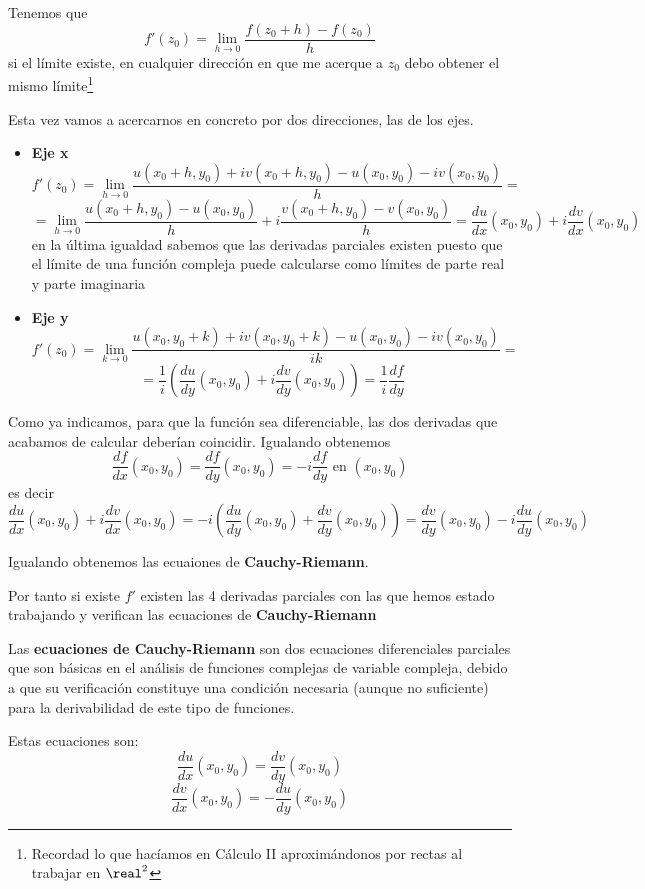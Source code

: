 \documentclass{apuntes}
\begin{document}
Tenemos que
\[f'(z_0)=\lim_{h \to 0} \frac{f(z_0+h)-f(z_0)}{h}\]
si el límite existe, en cualquier dirección en que me acerque a $z_0$ debo obtener el mismo límite\footnote{Recordad lo que hacíamos en Cálculo II aproximándonos por rectas al trabajar en $\real^2$}

Esta vez vamos a acercarnos en concreto por dos direcciones, las de los ejes.
\begin{itemize}
\item \textbf{Eje x}
\[f'(z_0)=\lim_{h \to 0} \frac{u(x_0+h,y_0)+iv(x_0+h,y_0)-u(x_0, y_0)-iv(x_0,y_0)}{h}=\]
\[= \lim_{h \to 0}\frac{u(x_0+h,y_0)-u(x_0, y_0)}{h}+i\frac{v(x_0+h,y_0)-v(x_0,y_0)}{h}=\frac{du}{dx}(x_0,y_0)+i\frac{dv}{dx}(x_0,y_0)\]
en la última igualdad sabemos que las derivadas parciales existen puesto que el límite de una función compleja puede calcularse como límites de parte real y parte imaginaria

\item \textbf{Eje y}
\[f'(z_0)=\lim_{k \to 0} \frac{u(x_0,y_0+k)+iv(x_0,y_0+k)-u(x_0, y_0)-iv(x_0,y_0)}{ik}=\]
\[=\frac{1}{i}\left(\frac{du}{dy}(x_0,y_0)+i \frac{dv}{dy}(x_0, y_0)\right)=\frac{1}{i}\frac{df}{dy}\]
\end{itemize}

Como ya indicamos, para que la función sea diferenciable, las dos derivadas que acabamos de calcular deberían coincidir. Igualando obtenemos
\[\frac{df}{dx}(x_0,y_0)=\frac{df}{dy}(x_0,y_0) = -i \frac{df}{dy} \text{ en } (x_0,y_0)\]
es decir
\[\frac{du}{dx}(x_0,y_0)+i\frac{dv}{dx}(x_0,y_0)=-i\left(\frac{du}{dy}(x_0,y_0)+\frac{dv}{dy}(x_0,y_0)\right)=\frac{dv}{dy}(x_0,y_0)-i\frac{du}{dy}(x_0,y_0)\]


Igualando obtenemos las ecuaiones de \textbf{Cauchy-Riemann}.

Por tanto si existe $f'$ existen las 4 derivadas parciales con las que hemos estado trabajando y verifican las ecuaciones de \textbf{Cauchy-Riemann}

\begin{defn}
Las \textbf{ecuaciones de Cauchy-Riemann} son dos ecuaciones diferenciales parciales que son básicas en el análisis de funciones complejas de variable compleja, debido a que su verificación constituye una condición necesaria (aunque no suficiente) para la derivabilidad de este tipo de funciones.

Estas ecuaciones son:
\[\frac{du}{dx}(x_0,y_0) = \frac{dv}{dy}(x_0,y_0)\]
\[\frac{dv}{dx}(x_0,y_0) = -\frac{du}{dy}(x_0,y_0)\]
\end{defn}
\end{document}
